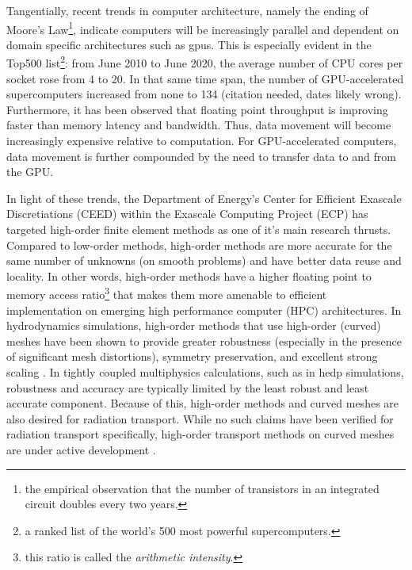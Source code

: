 \documentclass[../doc.tex]{subfiles}
\begin{document}
Tangentially, recent trends in computer architecture, namely the ending of Moore's Law\footnote{the empirical observation that the number of transistors in an integrated circuit doubles every two years.}, indicate computers will be increasingly parallel and dependent on domain specific architectures such as \glspl{gpu}. This is especially evident in the Top500 list\footnote{a ranked list of the world's 500 most powerful supercomputers.}: from June 2010 to June 2020, the average number of CPU cores per socket rose from 4 to 20. In that same time span, the number of GPU-accelerated supercomputers increased from none to 134 (citation needed, dates likely wrong). Furthermore, it has been observed that floating point throughput is improving faster than memory latency and bandwidth. Thus, data movement will become increasingly expensive relative to computation. For GPU-accelerated computers, data movement is further compounded by the need to transfer data to and from the GPU. 

In light of these trends, the Department of Energy's Center for Efficient Exascale Discretiations (CEED) within the Exascale Computing Project (ECP) has targeted high-order finite element methods as one of it's main research thrusts. Compared to low-order methods, high-order methods are more accurate for the same number of unknowns (on smooth problems) and have better data reuse and locality. In other words, high-order methods have a higher floating point to memory access ratio\footnote{this ratio is called the \emph{arithmetic intensity}.} that makes them more amenable to efficient implementation on emerging high performance computer (HPC) architectures. In hydrodynamics simulations, high-order methods that use high-order (curved) meshes have been shown to provide greater robustness (especially in the presence of significant mesh distortions), symmetry preservation, and excellent strong scaling \cite{blast,blast2,blast3}. In tightly coupled multiphysics calculations, such as in \gls{hedp} simulations, robustness and accuracy are typically limited by the least robust and least accurate component. Because of this, high-order methods and curved meshes are also desired for radiation transport. While no such claims have been verified for radiation transport specifically, high-order transport methods on curved meshes are under active development \cite{graph_sweeps,ldrd_dsa,YEE2020109696,olivier_mandc}. 
\end{document}
